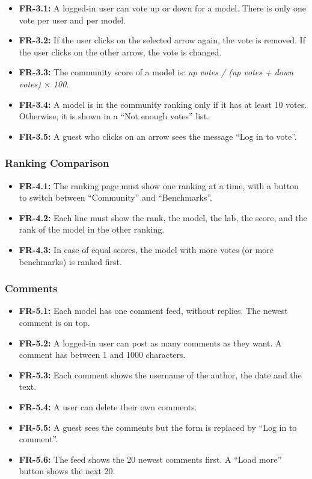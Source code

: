 \documentclass[11pt,a4paper]{article}
\begin{document}
\begin{itemize}
  \item \textbf{FR-3.1:} A logged-in user can vote up or down for a model. There is only one vote per user and per model.
  \item \textbf{FR-3.2:} If the user clicks on the selected arrow again, the vote is removed. If the user clicks on the other arrow, the vote is changed.
  \item \textbf{FR-3.3:} The community score of a model is: \emph{up votes / (up votes + down votes) $\times$ 100}.
  \item \textbf{FR-3.4:} A model is in the community ranking only if it has at least 10 votes. Otherwise, it is shown in a ``Not enough votes'' list.
  \item \textbf{FR-3.5:} A guest who clicks on an arrow sees the message ``Log in to vote''.
\end{itemize}

\subsubsection{Ranking Comparison}

\begin{itemize}
  \item \textbf{FR-4.1:} The ranking page must show one ranking at a time, with a button to switch between ``Community'' and ``Benchmarks''.
  \item \textbf{FR-4.2:} Each line must show the rank, the model, the lab, the score, and the rank of the model in the other ranking.
  \item \textbf{FR-4.3:} In case of equal scores, the model with more votes (or more benchmarks) is ranked first.
\end{itemize}

\subsubsection{Comments}

\begin{itemize}
  \item \textbf{FR-5.1:} Each model has one comment feed, without replies. The newest comment is on top.
  \item \textbf{FR-5.2:} A logged-in user can post as many comments as they want. A comment has between 1 and 1000 characters.
  \item \textbf{FR-5.3:} Each comment shows the username of the author, the date and the text.
  \item \textbf{FR-5.4:} A user can delete their own comments.
  \item \textbf{FR-5.5:} A guest sees the comments but the form is replaced by ``Log in to comment''.
  \item \textbf{FR-5.6:} The feed shows the 20 newest comments first. A ``Load more'' button shows the next 20.
\end{itemize}
\end{document}
